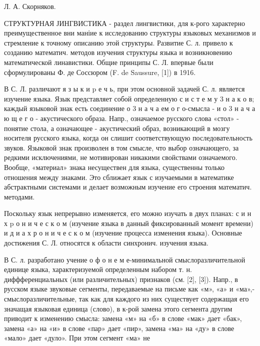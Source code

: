 \documentclass[10pt]{article}
\begin{document}
Л. А. Скорняков.



СТРУКТУРНАЯ ЈИНГВИСТИКА - раздел лингвистики, для к-рого характерно преимущественное вни маніие к исследованию структуры языковых механизмов и стремление к точному описанию этой структуры. Развитие С. л. привело к созданию математич. методов изучения структуры языка и возникновению математической линавистики. Общие принципы С. Л. впервые были сформулированы Ф. де Соссюром (F. de Saussure, [1]) в 1916.



В С. Л. различают я з ы к и $\mathrm{p}$ е ч ь, при этом основной задачей С. л. является изучение языка. Язык представляет собой определенную с и с т е м у 3 н а к о в; каждый языковой знак есть соединение о 3 н а ч а ем о г о-смысла - и о 3 н а ч а ю щ е г о - акустического образа. Напр., означаемое русского слова «стол» - понятие стола, а означающее - акустический образ, возникающий в мозгу носителя русского языка, когда он слишит соответствующую последовательность звуков. Языковой знак произволен в том смысле, что выбор означающего, за редкими исключениями, не мотивирован никакими свойствами означаемого. Вообще, «материал» знака несуществен для языка, существенны только отношения между знаками. Это сближает язык с изучаемыми в математике абстрактными системами и делает возможным изучение его строения математич. методами.



Поскольку язык непрерывно изменяется, его можно изучать в двух планах: с и н х $\mathrm{p}$ о н и ч е с к о м (изучение языка в данный фиксированный момент времени) и д и а х р о н и ч е с к о м (изучение процесса изменения языка). Основные достижения С. Л. относятся к области синхронич. изучения языка.



В С. л. разработано учение о ф о н е м е-минимальной смыслоразличительной единице языка, характеризуемой определенным набором т. н. диффференциальных (или различительных) признаков (см. [2], [3]). Напр., в русском языке звуковые сегменты, передаваемые на письме как «м», «а» и «ма»,- смыслоразличительные, так как для каждого из них существует содержащая его значащая языковая единица (слово), в к-рой замена этого сегмента другим приводит к изменению смысла: замена «м» на «б» в слове «мак» дает «бак», замена «а» на «и» в слове «пар» дает «пир», замена «ма» на «ду» в слове «мало» дает «дуло». При этом сегмент «ма» не
\end{document}
